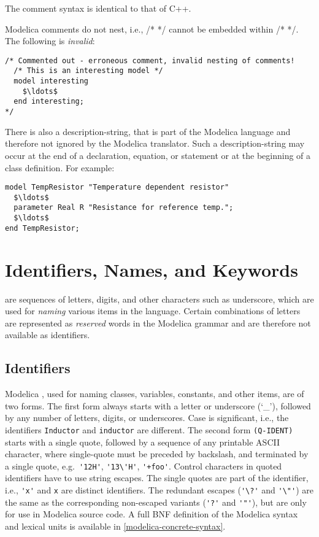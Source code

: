 \begin{nonnormative}
The comment syntax is identical to that of C++.
\end{nonnormative}

Modelica comments do not nest, i.e., /* */ cannot be embedded within /*
*/. The following is \emph{invalid}:
\begin{lstlisting}[language=modelica]
/* Commented out - erroneous comment, invalid nesting of comments!
  /* This is an interesting model */
  model interesting
    $\ldots$
  end interesting;
*/
\end{lstlisting}

There is also a description-string, that is part of the Modelica language and
therefore not ignored by the Modelica translator. Such a description-string may
occur at the end of a declaration, equation, or statement or at the
beginning of a class definition. For example:
\begin{lstlisting}[language=modelica]
model TempResistor "Temperature dependent resistor"
  $\ldots$
  parameter Real R "Resistance for reference temp.";
  $\ldots$
end TempResistor;
\end{lstlisting}

\section{Identifiers, Names, and Keywords}\label{identifiers-names-and-keywords}

 are sequences of letters, digits, and other characters such as underscore, which are used for \emph{naming} various items in the language.
Certain combinations of letters are  represented as \emph{reserved} words in the Modelica grammar and are therefore not available as identifiers.

\subsection{Identifiers}\label{identifiers}

Modelica , used for naming classes, variables, constants, and other items, are of two forms.
The first form always starts with a letter or underscore (`\_'), followed by any number of letters, digits, or underscores.
Case is significant, i.e., the identifiers \lstinline!Inductor! and \lstinline!inductor! are different.
The second form \lstinline!(Q-IDENT)! starts with a single quote, followed by a sequence of any printable ASCII character, where single-quote must be preceded by backslash, and terminated by a single quote, e.g.\ \lstinline!'12H'!, \lstinline!'13\'H'!, \lstinline!'+foo'!.
Control characters in quoted identifiers have to use string escapes.
The single quotes are part of the identifier, i.e., \lstinline!'x'! and \lstinline!x! are distinct identifiers.
The redundant escapes (\lstinline!'\?'! and \lstinline!'\"'!) are the same as the corresponding non-escaped variants (\lstinline!'?'! and \lstinline!'"'!), but are only for use in Modelica source code.
A full BNF definition of the Modelica syntax and lexical units is available in \cref{modelica-concrete-syntax}.

